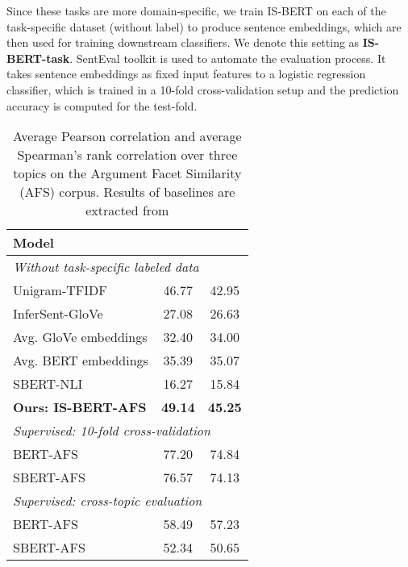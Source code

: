 \documentclass[11pt,a4paper]{article}
\begin{document}
Since these tasks are more domain-specific, we train IS-BERT on each of the task-specific dataset (without label) to produce sentence embeddings, which are then used for training downstream classifiers. We denote this setting as \textbf{IS-BERT-task}.
SentEval \cite{conneau2018} toolkit is used to automate the evaluation process. It takes sentence embeddings as fixed input features to a logistic regression classifier, which is trained in a 10-fold cross-validation setup and the prediction accuracy is computed for the test-fold. 
\medskip

\begin{table}[t]
\centering
\begin{tabular}{l|cc}
\toprule
\textbf{Model}&&\\
\midrule
\midrule
\multicolumn{3}{l}{\emph{Without task-specific labeled data}}\\
\midrule
Unigram-TFIDF &46.77 &42.95\\
InferSent-GloVe &27.08 &26.63\\
Avg. GloVe embeddings &32.40 &34.00\\
Avg. BERT embeddings &35.39 &35.07\\
SBERT-NLI &16.27 &15.84\\
\hline
\textbf{Ours: IS-BERT-AFS} &\bf{49.14} &\bf{45.25}\\
\bottomrule
\toprule
\multicolumn{3}{l}{\emph{Supervised: 10-fold cross-validation}}\\
\hline
BERT-AFS &77.20 &74.84\\
SBERT-AFS &76.57 &74.13\\
\bottomrule
\toprule
\multicolumn{3}{l}{\emph{Supervised: cross-topic evaluation}}\\
\hline
BERT-AFS &58.49 &57.23\\
SBERT-AFS &52.34 &50.65\\
\bottomrule
\end{tabular}
\caption{Average Pearson correlation  and average Spearman's rank correlation  over three topics on the Argument Facet Similarity (AFS) corpus. Results of baselines are extracted from \cite{reimers2019, reimers2019b}} \label{table:afs}
\end{table} 
\end{document}
